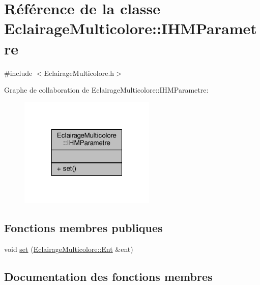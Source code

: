 \hypertarget{classEclairageMulticolore_1_1IHMParametre}{}\section{Référence de la classe Eclairage\+Multicolore\+:\+:I\+H\+M\+Parametre}
\label{classEclairageMulticolore_1_1IHMParametre}


{\ttfamily \#include $<$Eclairage\+Multicolore.\+h$>$}



Graphe de collaboration de Eclairage\+Multicolore\+:\+:I\+H\+M\+Parametre\+:
\nopagebreak
\begin{figure}[H]
\begin{center}
\leavevmode
\includegraphics[width=184pt]{classEclairageMulticolore_1_1IHMParametre__coll__graph}
\end{center}
\end{figure}
\subsection*{Fonctions membres publiques}
\begin{DoxyCompactItemize}
\item 
void \hyperlink{classEclairageMulticolore_1_1IHMParametre_a2ed609d0e667d937d8e4b686b93af18c}{set} (\hyperlink{classEclairageMulticolore_1_1Ent}{Eclairage\+Multicolore\+::\+Ent} \&ent)
\end{DoxyCompactItemize}


\subsection{Documentation des fonctions membres}
\mbox{\label{classEclairageMulticolore_1_1IHMParametre_a2ed609d0e667d937d8e4b686b93af18c}} 
